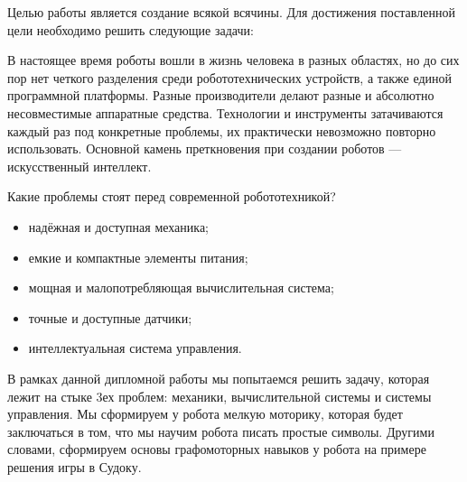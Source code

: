 \Introduction

Целью работы является создание всякой всячины. Для достижения поставленной цели необходимо решить следующие задачи:

В настоящее время роботы вошли в жизнь человека в разных областях, но до сих пор нет четкого разделения среди робототехнических устройств, а также единой программной платформы. Разные производители делают разные и абсолютно несовместимые аппаратные средства. Технологии и инструменты затачиваются каждый раз под конкретные проблемы, их практически невозможно повторно использовать. Основной камень преткновения при создании роботов — искусственный интеллект. 

Какие проблемы стоят перед современной робототехникой?

\begin{itemize}
\item надёжная и доступная механика;
\item емкие и компактные элементы питания;
\item мощная и малопотребляющая вычислительная система;
\item точные и доступные датчики;
\item интеллектуальная система управления.
\end{itemize}

В рамках данной дипломной работы мы попытаемся решить задачу, которая лежит на стыке 3ех проблем: механики, вычислительной системы и системы управления.
Мы сформируем у робота мелкую моторику, которая будет заключаться в том, что мы научим робота писать простые символы. Другими словами, сформируем основы графомоторных навыков у робота на примере решения игры в Судоку.
